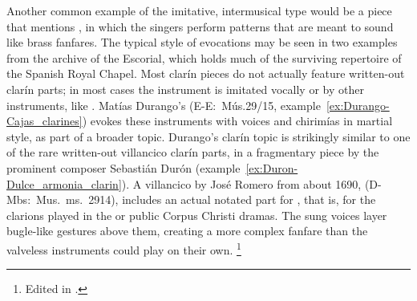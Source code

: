 Another common example of the imitative, intermusical type would be a piece that mentions  , in which the singers perform patterns that are meant to sound like brass fanfares.
The typical style of  evocations may be seen in two examples from the archive of the Escorial, which holds much of the surviving repertoire of the Spanish Royal Chapel.
Most clarín pieces do not actually feature written-out clarín parts; in most cases the instrument is imitated vocally or by other instruments, like .
Matías Durango's   (E-E:~Mús.29/15, example~\ref{ex:Durango-Cajas_clarines}) evokes these instruments with voices and chirimías in martial style, as part of a broader  topic.
Durango's clarín topic is strikingly similar to one of the rare written-out villancico clarín parts, in a fragmentary piece by the prominent composer Sebastián Durón (example~\ref{ex:Duron-Dulce_armonia_clarin}).
A villancico by José Romero from about 1690,   (D-Mbs:~Mus.~ms.~2914), includes an actual notated part for , that is, for the clarions played in the  or public Corpus Christi dramas. 
The sung voices layer bugle-like gestures above them, creating a more complex fanfare than the valveless instruments could play on their own.%
	\footnote{%
	Edited in \autocite[655--661]{CaberoPueyo:PhD}.
	}

%
%


